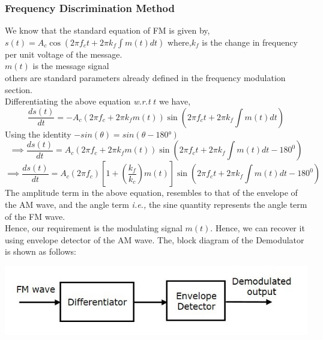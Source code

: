 \documentclass[12pt,a4paper]{article}%
\begin{document}
\begin{flushleft}
\begin{flushleft}
\begin{flushleft}
\begin{flushleft}
					\subsubsection{Frequency Discrimination Method}
					\begin{flushleft}
						We know that the standard equation of FM is given by,\\
						$s\left ( t \right ) =A_c \cos \left ( 2 \pi f_ct+2 \pi k_f \int m\left ( t \right )dt \right )$
						where,$k_f$ is the change in frequency per unit voltage of the message.\\
						$m(t)$ is the message signal\\
						others are standard parameters already defined in the frequency modulation section.\\
						Differentiating the above equation \textit{w.r.t} $t$ we have,
						\begin{equation}
						\frac{ds\left ( t \right )}{dt}= -A_c\left ( 2 \pi f_c+2 \pi k_fm\left ( t \right ) \right ) \sin\left ( 2 \pi f_ct+2 \pi k_f\int m\left ( t \right )dt \right )
						\end{equation} 
						Using the identity $-sin(\theta)=sin(\theta-\ang{180} )$
						\begin{equation}
						\implies \frac{ds(t)}{dt}=A_c\left ( 2 \pi f_c+2 \pi k_fm\left ( t \right ) \right )\sin\left ( 2 \pi f_ct+2 \pi k_f \int m\left ( t \right )dt-180^0  \right )
						\end{equation}
						\begin{equation}
						\implies \frac{ds(t)}{dt}=A_c\left ( 2 \pi f_c \right )\left [ 1+\left ( \frac{k_f}{k_c} \right )m\left ( t \right ) \right ] \sin\left ( 2 \pi f_ct+2 \pi k_f\int m\left ( t \right )dt-180^0 \right )
						\end{equation}
						The amplitude term in the above equation, resembles to that of the envelope of the AM wave, and the angle term \textit{i.e.,} the sine quantity represents the angle term of the FM wave.\\\smallskip
						Hence, our requirement is the modulating signal $m(t)$. Hence, we can recover it using envelope detector of the AM wave. The, block diagram of the Demodulator is shown as follows:
						\begin{center}
							\includegraphics[width=0.60 \textwidth]{./images/Frequency Discrimination method.png}

\end{center}
\end{flushleft}
\end{flushleft}
\end{flushleft}
\end{flushleft}
\end{flushleft}
\end{document}
